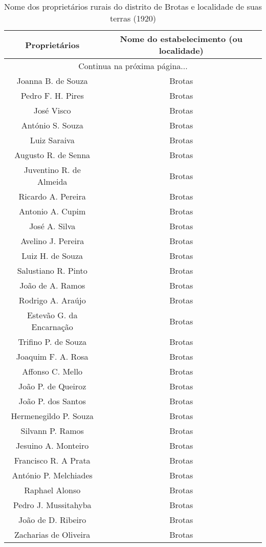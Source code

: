 \begin{tiny}
\begin{longtable}{cc}
\caption{Nome dos proprietários rurais do distrito de Brotas e localidade de suas terras (1920)}\label{tab:proprurais}\\
\hline Proprietários & Nome do estabelecimento (ou localidade) \\ \hline\hline \endhead
\hline \multicolumn{2}{c}{Continua na próxima página...} \\ \endfoot
\hline \endlastfoot
Joanna B. de Souza  & Brotas \\
Pedro F. H. Pires  & Brotas \\
José Visco  & Brotas \\
António S. Souza  & Brotas \\
Luiz Saraiva  & Brotas \\
Augusto R. de Senna  & Brotas \\
Juventino R. de Almeida  & Brotas \\
Ricardo A. Pereira  & Brotas \\
Antonio A. Cupim & Brotas \\
José A. Silva & Brotas \\
Avelino J. Pereira & Brotas \\
Luiz H. de Souza & Brotas \\
Salustiano R. Pinto & Brotas \\
João de A. Ramos & Brotas \\
Rodrigo A. Araújo & Brotas \\
Estevão G. da Encarnação & Brotas \\
Trifino P. de Souza & Brotas \\
Joaquim F. A. Rosa & Brotas \\
Affonso C. Mello & Brotas \\
João P. de Queiroz & Brotas \\
João P. dos Santos & Brotas \\
Hermenegildo P. Souza & Brotas \\
Silvann P. Ramos & Brotas \\
Jesuino A. Monteiro & Brotas \\
Francisco R. A Prata & Brotas \\
António P. Melchiades & Brotas \\
Raphael Alonso & Brotas \\
Pedro J. Mussitahyba & Brotas \\
João de D. Ribeiro & Brotas \\
Zacharias de Oliveira & Brotas \\

\end{longtable}
\end{tiny}
